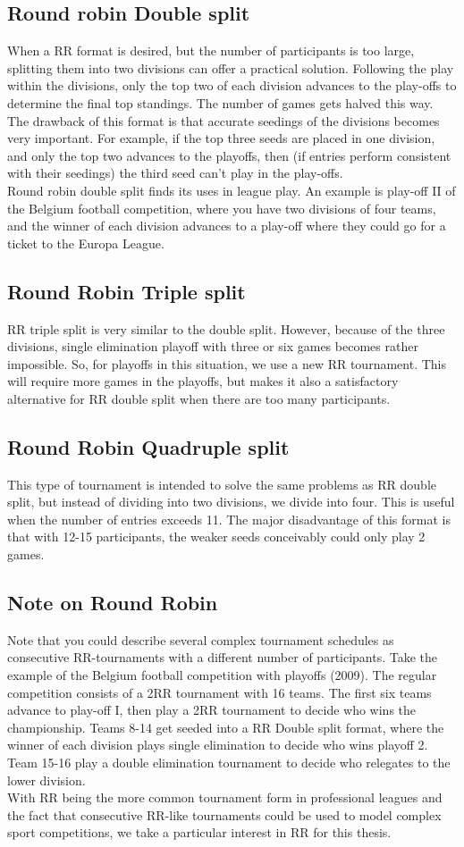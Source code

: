 \subsection{Round robin Double split}
When a RR format is desired, but the number of participants is too large, splitting them into two divisions can offer a practical solution. Following the play within the divisions, only the top two of each division advances to the play-offs to determine the final top standings. The number of games gets halved this way. The drawback of this format is that accurate seedings of the divisions becomes very important. For example, if the top three seeds are placed in one division, and only the top two advances to the playoffs, then (if entries perform consistent with their seedings) the third seed can’t play in the play-offs.
\\[5px]
Round robin double split finds its uses in league play. An example is play-off II of the Belgium football competition, where you have two divisions of four teams, and the winner of each division advances to a play-off where they could go for a ticket to the Europa League.
\subsection{Round Robin Triple split}
RR triple split is very similar to the double split. However, because of the three divisions, single elimination playoff with three or six games becomes rather impossible. So, for playoffs in this situation, we use a new RR tournament. This will require more games in the playoffs, but makes it also a satisfactory alternative for RR double split when there are too many participants.
\subsection{Round Robin Quadruple split}
This type of tournament is intended to solve the same problems as RR double split, but instead of dividing into two divisions, we divide into four. This is useful when the number of entries exceeds 11. The major disadvantage of this format is that with 12-15 participants, the weaker seeds conceivably could only play 2 games.
\subsection{Note on Round Robin}
Note that you could describe several complex tournament schedules as consecutive RR-tournaments with a different number of participants. Take the example of the Belgium football competition with playoffs (2009). The regular competition consists of a 2RR tournament with 16 teams. The first six teams advance to play-off I, then play a 2RR tournament to decide who wins the championship. Teams 8-14 get seeded into a RR Double split format, where the winner of each division plays single elimination to decide who wins playoff 2. Team 15-16 play a double elimination tournament to decide who relegates to the lower division.
\\[5px]
With RR being the more common tournament form in professional leagues and the fact that consecutive RR-like tournaments could be used to model complex sport competitions, we take a particular interest in RR for this thesis.
